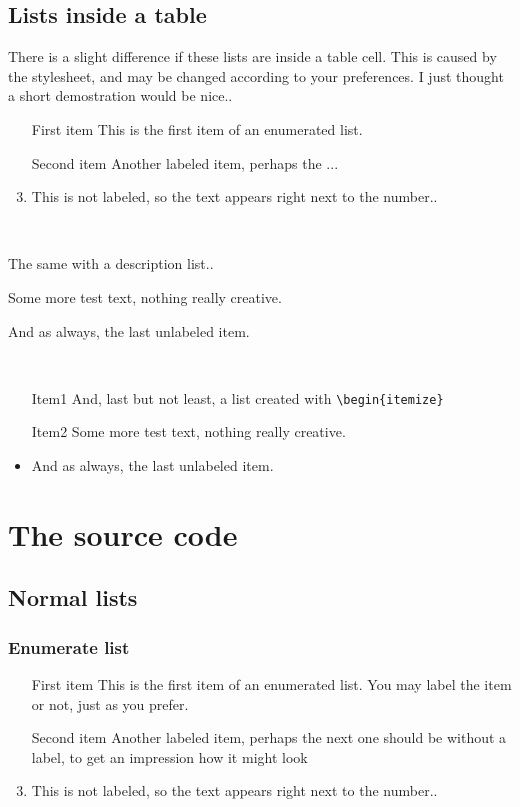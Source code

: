 \documentclass{generic}
\begin{document}
\subsection{Lists inside a table}

There is a slight difference if these lists are inside a table cell. This is caused by the
stylesheet, and may be changed according to your preferences. I just thought a short
demostration would be nice..


\begin{table}
\begin{enumerate}
\item[First item]
  This is the first item of an enumerated list. 
\item[Second item]
  Another labeled item, perhaps the ...
\item
  This is not labeled, so the text appears right 
  next to the number..
\end{enumerate} 
\\

\begin{description}
\item[Item1]
  The same with a description list..
\item[Item2]
  Some more test text, nothing really creative.
\item
  And as always, the last unlabeled item.
\end{description}
\\

\begin{itemize}
\item[Item1]
  And, last but not least, a list created with \verb/\begin{itemize}/
\item[Item2]
  Some more test text, nothing really creative.
\item
  And as always, the last unlabeled item.
\end{itemize}

\end{table}

\section{The source code}
\subsection{Normal lists}

\verbatim
\subsubsection{Enumerate list}
\begin{enumerate}
\item[First item]
  This is the first item of an enumerated list. 
  You may label the item or not, just as you prefer.
\item[Second item]
  Another labeled item, perhaps the next one should 
  be without a label, to get an impression
  how it might look
\item
  This is not labeled, so the text appears right 
  next to the number..
\end{enumerate} 
\end{document}
